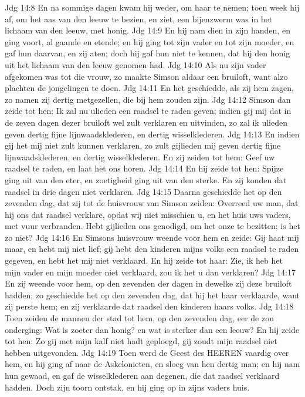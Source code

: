 Jdg 14:8  En na sommige dagen kwam hij weder, om haar te nemen; toen week hij af, om het aas van den leeuw te bezien, en ziet, een bijenzwerm was in het lichaam van den leeuw, met honig.
Jdg 14:9  En hij nam dien in zijn handen, en ging voort, al gaande en etende; en hij ging tot zijn vader en tot zijn moeder, en gaf hun daarvan, en zij aten; doch hij gaf hun niet te kennen, dat hij den honig uit het lichaam van den leeuw genomen had.
Jdg 14:10  Als nu zijn vader afgekomen was tot die vrouw, zo maakte Simson aldaar een bruiloft, want alzo plachten de jongelingen te doen.
Jdg 14:11  En het geschiedde, als zij hem zagen, zo namen zij dertig metgezellen, die bij hem zouden zijn.
Jdg 14:12  Simson dan zeide tot hen: Ik zal nu ulieden een raadsel te raden geven; indien gij mij dat in de zeven dagen dezer bruiloft wel zult verklaren en uitvinden, zo zal ik ulieden geven dertig fijne lijnwaadsklederen, en dertig wisselklederen.
Jdg 14:13  En indien gij het mij niet zult kunnen verklaren, zo zult gijlieden mij geven dertig fijne lijnwaadsklederen, en dertig wisselklederen. En zij zeiden tot hem: Geef uw raadsel te raden, en laat het ons horen.
Jdg 14:14  En hij zeide tot hen: Spijze ging uit van den eter, en zoetigheid ging uit van den sterke. En zij konden dat raadsel in drie dagen niet verklaren.
Jdg 14:15  Daarna geschiedde het op den zevenden dag, dat zij tot de huisvrouw van Simson zeiden: Overreed uw man, dat hij ons dat raadsel verklare, opdat wij niet misschien u, en het huis uws vaders, met vuur verbranden. Hebt gijlieden ons genodigd, om het onze te bezitten; is het zo niet?
Jdg 14:16  En Simsons huisvrouw weende voor hem en zeide: Gij haat mij maar, en hebt mij niet lief; gij hebt den kinderen mijns volks een raadsel te raden gegeven, en hebt het mij niet verklaard. En hij zeide tot haar: Zie, ik heb het mijn vader en mijn moeder niet verklaard, zou ik het u dan verklaren?
Jdg 14:17  En zij weende voor hem, op den zevenden der dagen in dewelke zij deze bruiloft hadden; zo geschiedde het op den zevenden dag, dat hij het haar verklaarde, want zij perste hem; en zij verklaarde dat raadsel den kinderen haars volks.
Jdg 14:18  Toen zeiden de mannen der stad tot hem, op den zevenden dag, eer de zon onderging: Wat is zoeter dan honig? en wat is sterker dan een leeuw? En hij zeide tot hen: Zo gij met mijn kalf niet hadt geploegd, gij zoudt mijn raadsel niet hebben uitgevonden.
Jdg 14:19  Toen werd de Geest des HEEREN vaardig over hem, en hij ging af naar de Askelonieten, en sloeg van hen dertig man; en hij nam hun gewaad, en gaf de wisselklederen aan degenen, die dat raadsel verklaard hadden. Doch zijn toorn ontstak, en hij ging op in zijns vaders huis.
